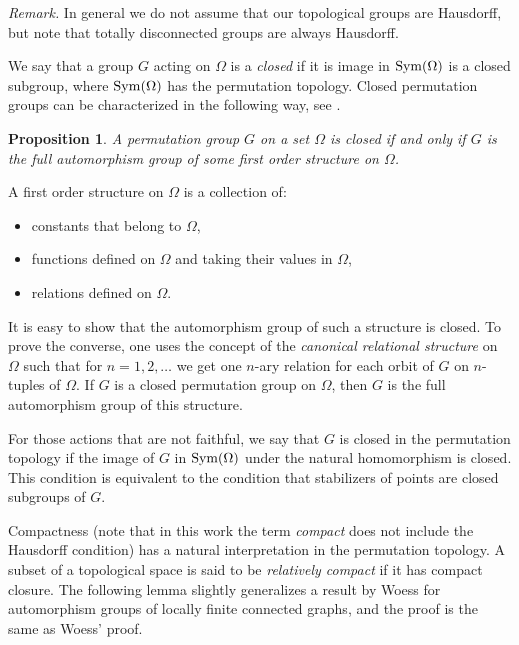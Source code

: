 \documentclass{emsprocart}
\newtheorem{proposition}[theorem]{Proposition}
\theoremstyle{definition}
\begin{document}
\bigskip
{\em Remark.}  In general we do not assume that our topological groups
are Hausdorff, but note that totally disconnected groups are always
Hausdorff.  

\smallskip

We say that a group $G$ acting on $\Omega$ is
a {\em closed} if it is image in ${\mbox{${\rm Sym}$}}(\Omega)$ is a closed subgroup, 
where ${\mbox{${\rm Sym}$}}(\Omega)$ has the permutation topology.  Closed
permutation groups can be characterized in the following way, see
\cite[Section 2.4]{Cameron1990}.

\begin{proposition}
A permutation group $G$ on a set $\Omega$ is closed if and only if $G$ is
the full automorphism group of some first order structure on $\Omega$.
\end{proposition}

\noindent
A first order structure on $\Omega$ is a collection of:
\begin{itemize}
\item constants that belong to $\Omega$,
\item functions defined on $\Omega$ and taking their values in $\Omega$,
\item relations defined on $\Omega$.
\end{itemize}
It is easy to show that the
automorphism group of such a structure is closed. To prove the converse,
one uses the concept of the {\em canonical relational structure} on $\Omega$
such that for $n=1, 2, \ldots$ we get one $n$-ary relation
for each orbit of $G$ on $n$-tuples of $\Omega$. If $G$ is a closed permutation group
on $\Omega$, then $G$ is the full automorphism group
of this structure.

For those actions that are not faithful,
  we say that $G$ is closed in the permutation
topology if the image of $G$ in ${\mbox{${\rm Sym}$}}(\Omega)$ under the natural
  homomorphism is closed.  This condition is
equivalent to the condition that
stabilizers of points are closed subgroups of $G$.

Compactness (note that in this work the term {\em compact} does not
include the Hausdorff condition) has a natural
interpretation in the permutation topology.
A subset of a topological space is said to be {\em
 relatively compact} if it has compact closure.
The following lemma slightly generalizes a result by Woess
for automorphism groups of locally finite connected
graphs, and the proof is the same as Woess' proof.
\end{document}
